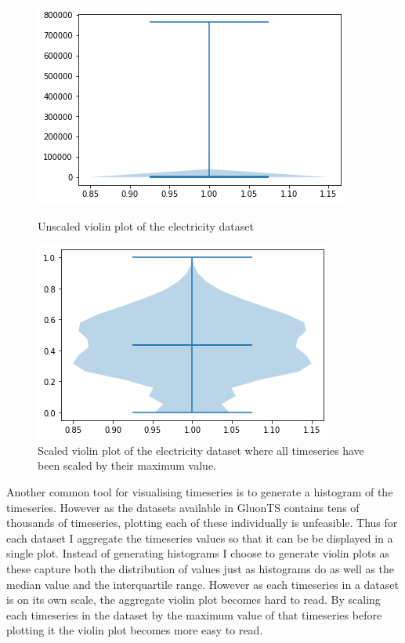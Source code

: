 \begin{figure}[htb]
    \centering
        \includegraphics[width=\linewidth]{4_designing/figures/electricity_violin_unscaled.png}
        \caption{Unscaled violin plot of the electricity dataset}
        \label{fig:electricity_violin_unscaled}
    \endminipage\hfill
        \includegraphics[width=\linewidth]{4_designing/figures/electricity_violin.png}
        \caption{Scaled violin plot of the electricity dataset where all timeseries have been scaled by their maximum value.}
        \label{fig:electricity_violin_scaled}
    \endminipage\hfill
\end{figure}


Another common tool for visualising timeseries is to generate a histogram of the timeseries. However as the datasets available in GluonTS contains tens of thousands of timeseries, plotting each of these individually is unfeasible. Thus for each dataset I aggregate the timeseries values so that it can be be displayed in a single plot. Instead of generating histograms I choose to generate violin plots as these capture both the distribution of values just as histograms do as well as the median value and the interquartile range. However as each timeseries in a dataset is on its own scale, the aggregate violin plot becomes hard to read. By scaling each timeseries in the dataset by the maximum value of that timeseries before plotting it the violin plot becomes more easy to read.  

